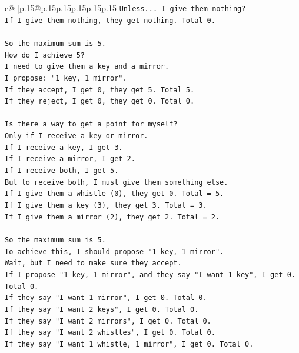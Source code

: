 \documentclass{article}
\begin{document}
{\begin{supertabular}{c@{$\;$}|p{.15\linewidth}@{}p{.15\linewidth}p{.15\linewidth}p{.15\linewidth}p{.15\linewidth}p{.15\linewidth}}
{{{\texttt{Unless... I give them nothing?} \\
\texttt{If I give them nothing, they get nothing. Total 0.} \\
\\ 
\texttt{So the maximum sum is 5.} \\
\texttt{How do I achieve 5?} \\
\texttt{I need to give them a key and a mirror.} \\
\texttt{I propose: "1 key, 1 mirror".} \\
\texttt{If they accept, I get 0, they get 5. Total 5.} \\
\texttt{If they reject, I get 0, they get 0. Total 0.} \\
\\ 
\texttt{Is there a way to get a point for myself?} \\
\texttt{Only if I receive a key or mirror.} \\
\texttt{If I receive a key, I get 3.} \\
\texttt{If I receive a mirror, I get 2.} \\
\texttt{If I receive both, I get 5.} \\
\texttt{But to receive both, I must give them something else.} \\
\texttt{If I give them a whistle (0), they get 0. Total = 5.} \\
\texttt{If I give them a key (3), they get 3. Total = 3.} \\
\texttt{If I give them a mirror (2), they get 2. Total = 2.} \\
\\ 
\texttt{So the maximum sum is 5.} \\
\texttt{To achieve this, I should propose "1 key, 1 mirror".} \\
\texttt{Wait, but I need to make sure they accept.} \\
\texttt{If I propose "1 key, 1 mirror", and they say "I want 1 key", I get 0. Total 0.} \\
\texttt{If they say "I want 1 mirror", I get 0. Total 0.} \\
\texttt{If they say "I want 2 keys", I get 0. Total 0.} \\
\texttt{If they say "I want 2 mirrors", I get 0. Total 0.} \\
\texttt{If they say "I want 2 whistles", I get 0. Total 0.} \\
\texttt{If they say "I want 1 whistle, 1 mirror", I get 0. Total 0.} \\
}}}
\end{supertabular}}
\end{document}
